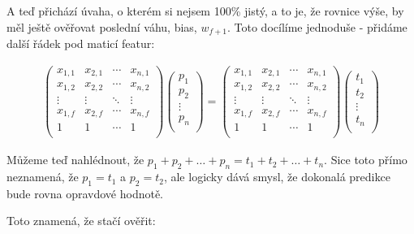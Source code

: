 \documentclass{../../../../ksp}
\begin{document}
A teď přichází úvaha, o kterém si nejsem 100\% jistý, a to je, že rovnice výše, by měl ještě
ověřovat poslední váhu, bias, $w_{f+1}$. Toto docílíme jednoduše - přidáme další řádek pod
maticí featur:

\begin{gather*}
    \begin{pmatrix}
        x_{1,1} & x_{2,1} & \cdots & x_{n,1}\\
        x_{1,2} & x_{2,2} & \cdots & x_{n,2}\\
        \vdots & \vdots & \ddots & \vdots\\
        x_{1,f} & x_{2,f} & \cdots & x_{n,f}\\
        1 & 1 & \cdots & 1\\
    \end{pmatrix}
    \begin{pmatrix}
        p_{1}\\
        p_{2}\\
        \vdots\\
        p_{n}\\
    \end{pmatrix}
    =
    \begin{pmatrix}
        x_{1,1} & x_{2,1} & \cdots & x_{n,1}\\
        x_{1,2} & x_{2,2} & \cdots & x_{n,2}\\
        \vdots & \vdots & \ddots & \vdots\\
        x_{1,f} & x_{2,f} & \cdots & x_{n,f}\\
        1 & 1 & \cdots & 1\\
    \end{pmatrix}
    \begin{pmatrix}
        t_{1}\\
        t_{2}\\
        \vdots\\
        t_{n}\\
    \end{pmatrix}
\end{gather*}

Můžeme teď nahlédnout, že $p_1 + p_2 + \ldots + p_n = t_1 + t_2 + \ldots + t_n$.
Sice toto přímo neznamená, že $p_1 = t_1$ a $p_2 = t_2$, ale logicky dává smysl, že dokonalá predikce bude
rovna opravdové hodnotě.

Toto znamená, že stačí ověřit:
\end{document}
